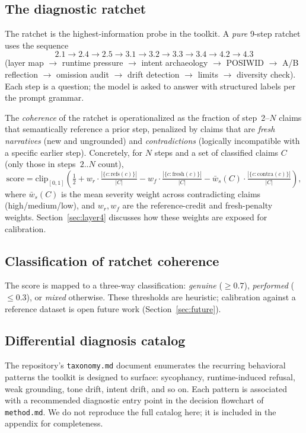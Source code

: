\subsection{The diagnostic ratchet}
\label{sec:ratchet}

The ratchet is the highest-information probe in the toolkit. A
\emph{pure} 9-step ratchet uses the sequence
$$2.1 \to 2.4 \to 2.5 \to 3.1 \to 3.2 \to 3.3 \to 3.4 \to 4.2 \to 4.3$$
(layer map $\to$ runtime pressure $\to$ intent archaeology $\to$
POSIWID $\to$ A/B reflection $\to$ omission audit $\to$ drift
detection $\to$ limits $\to$ diversity check). Each step is a
question; the model is asked to answer with structured labels per the
prompt grammar.

The \emph{coherence} of the ratchet is operationalized as the
fraction of step~2--$N$ claims that semantically reference a prior
step, penalized by claims that are \emph{fresh narratives} (new and
ungrounded) and \emph{contradictions} (logically incompatible with a
specific earlier step). Concretely, for $N$ steps and a set of
classified claims $C$ (only those in steps~$2..N$ count),
\begin{equation}
    \text{score} = \mathrm{clip}_{[0,1]}\!\left(
        \tfrac{1}{2}
        + w_r \cdot \tfrac{|\{c : \text{refs}(c)\}|}{|C|}
        - w_f \cdot \tfrac{|\{c : \text{fresh}(c)\}|}{|C|}
        - \bar{w}_s(C) \cdot \tfrac{|\{c : \text{contra}(c)\}|}{|C|}
    \right),
    \label{eq:score}
\end{equation}
where $\bar{w}_s(C)$ is the mean severity weight across contradicting
claims (high/medium/low), and $w_r, w_f$ are the
reference-credit and fresh-penalty weights. Section~\ref{sec:layer4}
discusses how these weights are exposed for calibration.

\subsection{Classification of ratchet coherence}

The score is mapped to a three-way classification: \emph{genuine}
($\geq 0.7$), \emph{performed} ($\leq 0.3$), or \emph{mixed}
otherwise. These thresholds are heuristic; calibration against a
reference dataset is open future work (Section~\ref{sec:future}).


\subsection{Differential diagnosis catalog}
\label{sec:taxonomy}

The repository's \texttt{taxonomy.md} document enumerates the
recurring behavioral patterns the toolkit is designed to surface:
sycophancy, runtime-induced refusal, weak grounding, tone drift,
intent drift, and so on. Each pattern is associated with a recommended
diagnostic entry point in the decision flowchart of \texttt{method.md}.
We do not reproduce the full catalog here; it is included in the
appendix for completeness.
